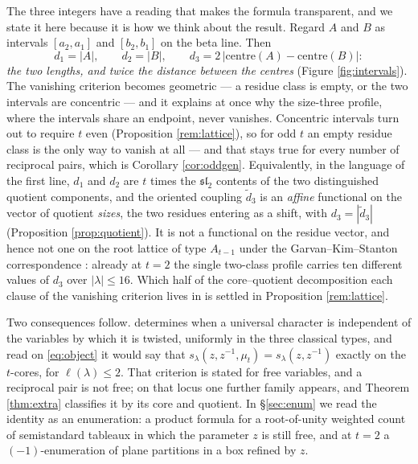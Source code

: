 \documentclass[11pt,reqno]{amsart}
\theoremstyle{plain}
\theoremstyle{definition}
\newcommand{\zt}{\mu_t}
\begin{document}
The three integers have a reading that makes the formula transparent, and we state it here because it
is how we think about the result. Regard $A$ and $B$ as intervals $[a_2,a_1]$ and $[b_2,b_1]$ on the
beta line. Then
\begin{equation}\label{eq:intervals}
d_1=|A|,\qquad d_2=|B|,\qquad d_3=2\,\bigl|\mathrm{centre}(A)-\mathrm{centre}(B)\bigr| :
\end{equation}
\emph{the two lengths, and twice the distance between the centres} (Figure \ref{fig:intervals}). The
vanishing criterion becomes geometric --- a residue class is empty, or the two intervals are
concentric --- and it explains at once why the size-three profile, where the intervals share an
endpoint, never vanishes. Concentric intervals turn out to require $t$ even (Proposition
\ref{rem:lattice}), so for odd $t$ an empty residue class is the only way to vanish at all --- and
that stays true for every number of reciprocal pairs, which is Corollary \ref{cor:oddgen}.
Equivalently, in the language of the first line, $d_1$ and $d_2$ are $t$
times the $\mathfrak{sl}_2$ contents of the two distinguished quotient components, and the oriented
coupling $\tilde d_3$ is an \emph{affine} functional on the vector of quotient \emph{sizes}, the two
residues entering as a shift, with $d_3=|\tilde d_3|$
(Proposition \ref{prop:quotient}). It is not a functional on the residue vector, and hence not one
on the root lattice of type $A_{t-1}$ under the Garvan--Kim--Stanton correspondence \cite{GKS90}:
already at $t=2$ the single two-class profile carries ten different values of $d_3$ over
$|\lambda|\le16$. Which half of the core--quotient decomposition each clause of the vanishing
criterion lives in is settled in Proposition \ref{rem:lattice}.

Two consequences follow. \cite[Theorem 5.3]{AK25} determines when a universal character is
independent of the variables by which it is twisted, uniformly in the three classical types, and read
on \eqref{eq:object} it would say that
$s_\lambda(z,z^{-1},\zt)=s_\lambda(z,z^{-1})$ exactly on the $t$-cores, for $\ell(\lambda)\le2$. That
criterion is stated for free variables, and a reciprocal pair is not free; on that locus one further
family appears, and
Theorem \ref{thm:extra} classifies it by its core and quotient. In \S\ref{sec:enum} we read the
identity as an enumeration: a product formula for a root-of-unity weighted count of semistandard
tableaux in which the parameter $z$ is still free, and at $t=2$ a $(-1)$-enumeration of plane
partitions in a box refined by $z$.
\end{document}
